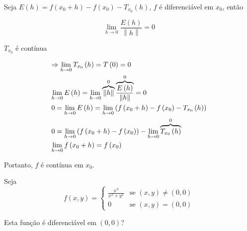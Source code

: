 \documentclass[11pt, oneside, a4paper]{gsm-l}
\begin{document}
\begin{dem}
    Seja $E\left( h \right) = f\left( {x_0  + h} \right) - f\left( {x_0 } \right) - T_{x_0} \left( h \right)$, $f$ é diferenciável em $x_0$, então

\[
    \mathop {\lim }\limits_{h \to 0} \frac{{E\left( h \right)}}{{\left\| h \right\|}} = 0
\]

$T_{x_0}$ é contínua

\[
\begin{gathered}
   \Rightarrow \mathop {\lim }\limits_{h \to 0} T_{x_0 } \left( h \right) = T\left( 0 \right) = 0 \hfill \\
  \mathop {\lim }\limits_{h \to 0} E\left( h \right) = \mathop {\lim }\limits_{h \to 0} \overbrace {\left\| h \right\|}^0\overbrace {\frac{{E\left( h \right)}}
{{\left\| h \right\|}}}^0 = 0 \hfill \\
  0 = \mathop {\lim }\limits_{h \to 0} E\left( h \right) = \mathop {\lim }\limits_{h \to 0} \left( {f\left( {x_0  + h} \right) - f\left( {x_0 } \right) - T_{x_0 } \left( h \right)} \right) \hfill \\
  0 = \mathop {\lim }\limits_{h \to 0} \left( {f\left( {x_0  + h} \right) - f\left( {x_0 } \right)} \right) - \mathop {\lim }\limits_{h \to 0} \overbrace {T_{x_0 } \left( h \right)}^0 \hfill \\
  \mathop {\lim }\limits_{h \to 0} f\left( {x_0  + h} \right) = f\left( {x_0 } \right) \hfill \\
\end{gathered}
\]

Portanto, $f$ é contínua em $x_0$.
\end{dem}

\begin{exem}
Seja
\begin{equation*}
f(x,y)=\left\{ \begin{array}{cl}\displaystyle
        \frac{{x^3}}{{x^2 + y^2 }} & \textrm{se }\left( {x,y} \right) \ne \left( {0,0} \right)\\
        0 & \textrm{se }\left( {x,y} \right) = \left( {0,0} \right)\end{array}\right.
\end{equation*}

Esta função é diferenciável em $(0,0)$?
\end{exem}
\end{document}
